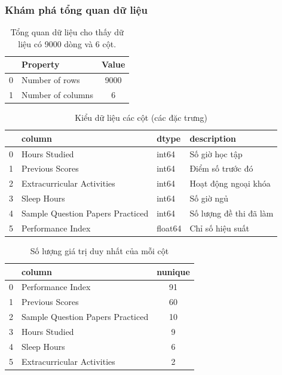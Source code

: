\subsubsection{Khám phá tổng quan dữ liệu}
\begin{table}[H]
	\centering
	\begin{tabular}{|c|l|c|}
		\hline
		\textbf{} & \textbf{Property} & \textbf{Value} \\ \hline
		0         & Number of rows    & 9000           \\
		1         & Number of columns & 6              \\ \hline
	\end{tabular}
	\caption{Tổng quan dữ liệu cho thấy dữ liệu có 9000 dòng và 6 cột.}
\end{table}

\begin{table}[H]
	\centering
	\begin{tabular}{|c|l|l|l|}
		\hline
		\textbf{} & \textbf{column}                  & \textbf{dtype} & \textbf{description}   \\ \hline
		0         & Hours Studied                    & int64          & Số giờ học tập         \\
		1         & Previous Scores                  & int64          & Điểm số trước đó       \\
		2         & Extracurricular Activities       & int64          & Hoạt động ngoại khóa   \\
		3         & Sleep Hours                      & int64          & Số giờ ngủ             \\
		4         & Sample Question Papers Practiced & int64          & Số lượng đề thi đã làm \\
		5         & Performance Index                & float64        & Chỉ số hiệu suất       \\ \hline
	\end{tabular}
	\caption{Kiểu dữ liệu các cột (các đặc trưng)}
\end{table}

\begin{table}[H]
	\centering
	\begin{tabular}{|c|l|c|}
		\hline
		\textbf{} & \textbf{column}                  & \textbf{nunique} \\ \hline
		0         & Performance Index                & 91               \\
		1         & Previous Scores                  & 60               \\
		2         & Sample Question Papers Practiced & 10               \\
		3         & Hours Studied                    & 9                \\
		4         & Sleep Hours                      & 6                \\
		5         & Extracurricular Activities       & 2                \\ \hline
	\end{tabular}
	\caption{Số lượng giá trị duy nhất của mỗi cột}
\end{table}

